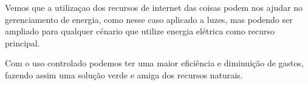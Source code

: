 \documentclass[openright]{normas-utf-tex} %
\begin{document}
Vemos que a utilizaçao dos recursos de internet das coisas podem nos ajudar no gerenciamento de energia, como nesse caso aplicado a luzes, mas podendo ser ampliado para qualquer cénario que utilize energia elétrica como recurso principal.

Com o uso controlado podemos ter uma maior eficiência e diminuição de gastos, fazendo assim uma solução verde e amiga dos recursos naturais.



\clearpage %
\label{bibstart}
\label{bibend}

%
%
%
%



\end{document}
